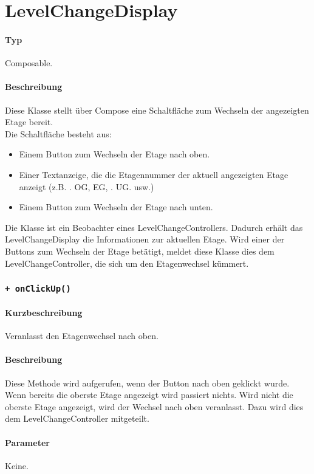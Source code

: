 \section{LevelChangeDisplay}
\paragraph*{Typ}
Composable.
\paragraph*{Beschreibung}
Diese Klasse stellt über Compose eine Schaltfläche zum Wechseln der angezeigten Etage bereit.\\
Die Schaltfläche besteht aus:
\begin{itemize}
    \item Einem Button zum Wechseln der Etage nach oben.
    \item Einer Textanzeige, die die Etagennummer der aktuell angezeigten Etage anzeigt 
    (z.B. . OG\dq, \dq EG\dq, . UG\dq. usw.)
    \item Einem Button zum Wechseln der Etage nach unten.
\end{itemize}
Die Klasse ist ein Beobachter eines LevelChangeControllers. Dadurch erhält das 
LevelChangeDisplay die Informationen zur aktuellen Etage. Wird einer der Buttons zum 
Wechseln der Etage betätigt, meldet diese Klasse dies dem LevelChangeController, 
die sich um den Etagenwechsel kümmert.

\subsubsection{\texttt{+ onClickUp()}}%
\paragraph*{Kurzbeschreibung}
Veranlasst den Etagenwechsel nach oben.
\paragraph*{Beschreibung}
Diese Methode wird aufgerufen, wenn der Button nach oben geklickt wurde. \\
Wenn bereits die oberste Etage angezeigt wird passiert nichts. 
Wird nicht die oberste Etage angezeigt, wird der Wechsel nach oben veranlasst.
Dazu wird dies dem LevelChangeController mitgeteilt.
\paragraph*{Parameter}
Keine.
